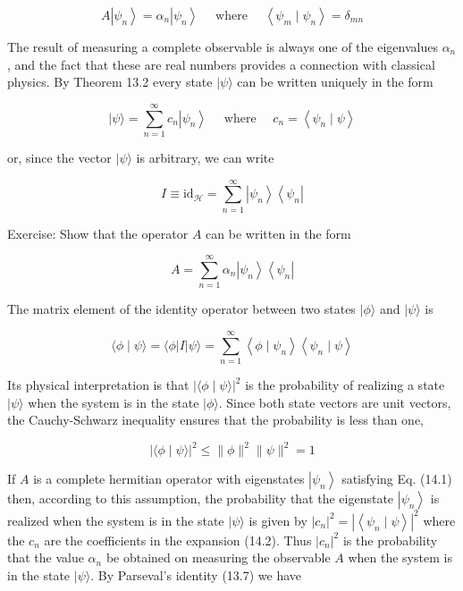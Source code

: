 \documentclass[10pt]{article}
\begin{document}
$$
A\left|\psi_{n}\right\rangle=\alpha_{n}\left|\psi_{n}\right\rangle \quad \text { where } \quad\left\langle\psi_{m} \mid \psi_{n}\right\rangle=\delta_{m n}
$$

The result of measuring a complete observable is always one of the eigenvalues $\alpha_{n}$, and the fact that these are real numbers provides a connection with classical physics. By Theorem 13.2 every state $|\psi\rangle$ can be written uniquely in the form

$$
|\psi\rangle=\sum_{n=1}^{\infty} c_{n}\left|\psi_{n}\right\rangle \quad \text { where } \quad c_{n}=\left\langle\psi_{n} \mid \psi\right\rangle
$$

or, since the vector $|\psi\rangle$ is arbitrary, we can write

$$
I \equiv \mathrm{id}_{\mathcal{H}}=\sum_{n=1}^{\infty}\left|\psi_{n}\right\rangle\left\langle\psi_{n}\right|
$$

Exercise: Show that the operator $A$ can be written in the form

$$
A=\sum_{n=1}^{\infty} \alpha_{n}\left|\psi_{n}\right\rangle\left\langle\psi_{n}\right|
$$

The matrix element of the identity operator between two states $|\phi\rangle$ and $|\psi\rangle$ is

$$
\langle\phi \mid \psi\rangle=\langle\phi|I| \psi\rangle=\sum_{n=1}^{\infty}\left\langle\phi \mid \psi_{n}\right\rangle\left\langle\psi_{n} \mid \psi\right\rangle
$$

Its physical interpretation is that $|\langle\phi \mid \psi\rangle|^{2}$ is the probability of realizing a state $|\psi\rangle$ when the system is in the state $|\phi\rangle$. Since both state vectors are unit vectors, the Cauchy-Schwarz inequality ensures that the probability is less than one,

$$
|\langle\phi \mid \psi\rangle|^{2} \leq\|\phi\|^{2}\|\psi\|^{2}=1
$$

If $A$ is a complete hermitian operator with eigenstates $\left|\psi_{n}\right\rangle$ satisfying Eq. (14.1) then, according to this assumption, the probability that the eigenstate $\left|\psi_{n}\right\rangle$ is realized when the system is in the state $|\psi\rangle$ is given by $\left|c_{n}\right|^{2}=\left|\left\langle\psi_{n} \mid \psi\right\rangle\right|^{2}$ where the $c_{n}$ are the coefficients in the expansion (14.2). Thus $\left|c_{n}\right|^{2}$ is the probability that the value $\alpha_{n}$ be obtained on measuring
the observable $A$ when the system is in the state $|\psi\rangle$. By Parseval's identity (13.7) we have
\end{document}
